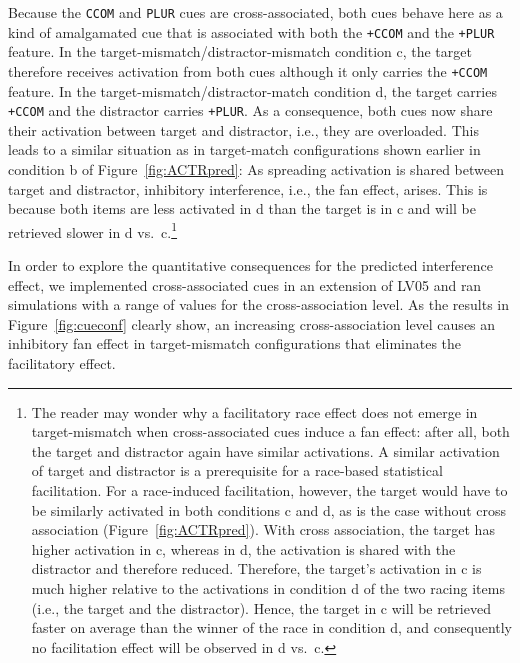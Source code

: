 \documentclass{cambridge7A}\usepackage[]{graphicx}\usepackage[]{color}
\newcommand{\actrcue}[1]{\texttt{\uppercase{#1}}}
\newcommand{\match}[1]{\texttt{+\uppercase{#1}}}
\begin{document}
Because the \actrcue{ccom} and \actrcue{plur} cues are cross-associated, both cues behave here as a kind of amalgamated cue that is associated with both the \match{ccom} and the \match{plur} feature. 
In the target-mismatch/distractor-mismatch condition c, the target therefore receives activation from both cues although it only carries the \match{ccom} feature.
In the target-mismatch/distractor-match condition d, the target carries \match{ccom} and the distractor carries \match{plur}. As a consequence, both cues now share their activation between target and distractor, i.e., they are overloaded. 
This leads to a similar situation as in target-match configurations shown earlier in condition b of Figure~\ref{fig:ACTRpred}: As  spreading activation is shared between target and distractor, inhibitory interference, i.e., the  fan effect, arises. This is because both items are less activated in d than the target is in c and will be retrieved slower in d vs.\ c.\footnote{The reader may wonder why a facilitatory race effect does not emerge in target-mismatch when cross-associated cues induce a fan effect: after all, both the target and distractor again have similar activations. A similar activation of target and distractor is   a prerequisite for a race-based statistical facilitation. 
For a race-induced facilitation, however, the target would have to be similarly activated in both conditions c and d, as is the case without cross association (Figure~\ref{fig:ACTRpred}). With cross association, the target has higher activation in c, whereas in d, the activation is shared with the distractor and therefore reduced. Therefore, the target's activation in c is much higher relative to the activations in condition d of the two racing items (i.e., the target and the distractor). Hence, the target in c will be retrieved faster on average than the winner of the race in condition d, and consequently no facilitation effect will be observed in d vs.\ c.} 

In order to explore the quantitative consequences for the predicted interference effect, we implemented cross-associated cues in an extension of LV05 and ran simulations with a range of values for the  cross-association level.
As the results in Figure~\ref{fig:cueconf} clearly show, an increasing cross-association level causes an inhibitory fan effect in target-mismatch configurations that eliminates the facilitatory effect.
\end{document}
